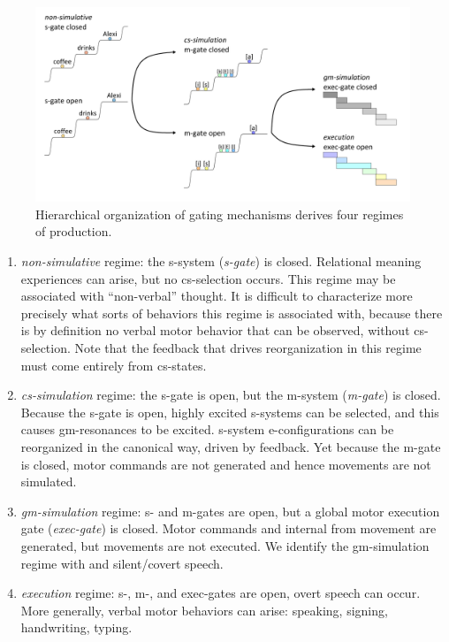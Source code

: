   
\begin{figure}
\includegraphics[width=\textwidth]{figures/Tilsen-img56.png}
\caption{Hierarchical organization of gating mechanisms derives four regimes of production.}
\label{fig:4:6}
\end{figure}
 
\begin{enumerate}
\item \textit{non-simulative} regime: the s-system  (\textit{s-gate}) is closed. Relational meaning experiences can arise, but no cs-selection occurs. This regime may be associated with “non-verbal” thought. It is difficult to characterize more precisely what sorts of behaviors this regime is associated with, because there is by definition no verbal motor behavior that can be observed, without cs-selection. Note that the feedback that drives reorganization in this regime must come entirely from cs-states.

\item \textit{cs-simulation} regime: the s-gate is open, but the m-system  (\textit{m-gate}) is closed. Because the s-gate is open, highly excited s-systems can be selected, and this causes gm-resonances to be excited. s-system e-configurations can be reorganized in the canonical way, driven by feedback. Yet because the m-gate is closed, motor commands are not generated and hence movements are not simulated. 

\item \textit{gm-simulation} regime: s- and m-gates are open,  but a global motor execution gate (\textit{exec-gate}) is closed. Motor commands and internal  from movement are generated, but movements are not executed. We identify the gm-simulation regime with  and silent/covert speech. 

\item \textit{execution} regime: s-, m-, and exec-gates are open, overt speech can occur. More generally, verbal motor behaviors can arise: speaking, signing, handwriting, typing.
\end{enumerate}


